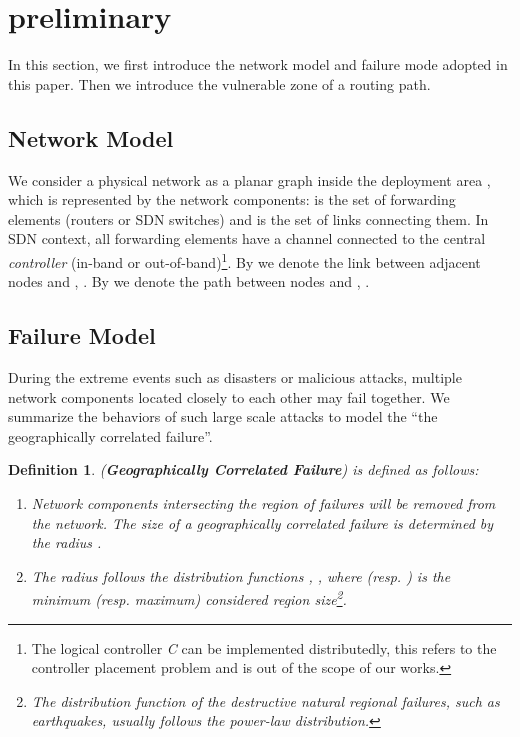 \documentclass[10pt,journal]{IEEEtran}
\newtheorem{definition}{Definition}
\begin{document}
\section{preliminary}\label{sec:preliminary}
In this section, we first introduce the network model and failure mode adopted in this paper. Then we introduce the vulnerable zone of a routing path. \subsection{Network Model}
We consider a physical network  as a planar graph inside the deployment area , which is represented by the network components:  is the set of forwarding elements (routers or SDN switches) and  is the set of links connecting them. In SDN context, all forwarding elements have a channel connected to the central \emph{controller}  (in-band or out-of-band)\footnote{The logical controller \emph{C} can be implemented distributedly\cite{heller2012controller,nguyen2013software}, this refers to the controller placement problem and is out of the scope of our works.}.
By  we denote the link between adjacent nodes  and , . By  we denote the path between nodes  and , .







\subsection{Failure Model}
During the extreme events such as disasters or malicious attacks, multiple network components located closely to each other may fail together. We summarize the behaviors of such large scale attacks to model the ``the geographically correlated failure''.



\begin{definition} (\textbf{Geographically Correlated Failure}) is defined as follows:
\begin{enumerate}
\item Network components intersecting the region of failures will be removed from the network. The size of a geographically correlated failure is determined by the radius .
\item The radius  follows the distribution functions , , where  (resp. ) is the minimum (resp. maximum) considered region size\footnote{The distribution function  of the destructive natural regional failures, such as earthquakes, usually follows the power-law distribution\cite{27627372}.}. \end{enumerate}
\end{definition}
\end{document}
